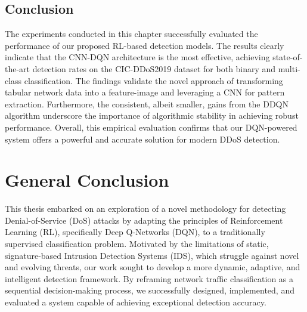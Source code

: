\documentclass[12pt]{report}
\begin{document}
\section{Conclusion}
The experiments conducted in this chapter successfully evaluated the performance of our proposed RL-based detection models. The results clearly indicate that the CNN-DQN architecture is the most effective, achieving state-of-the-art detection rates on the CIC-DDoS2019 dataset for both binary and multi-class classification. The findings validate the novel approach of transforming tabular network data into a feature-image and leveraging a CNN for pattern extraction. Furthermore, the consistent, albeit smaller, gains from the DDQN algorithm underscore the importance of algorithmic stability in achieving robust performance. Overall, this empirical evaluation confirms that our DQN-powered system offers a powerful and accurate solution for modern DDoS detection.

\chapter{General Conclusion}

This thesis embarked on an exploration of a novel methodology for detecting Denial-of-Service (DoS) attacks by adapting the principles of Reinforcement Learning (RL), specifically Deep Q-Networks (DQN), to a traditionally supervised classification problem. Motivated by the limitations of static, signature-based Intrusion Detection Systems (IDS), which struggle against novel and evolving threats, our work sought to develop a more dynamic, adaptive, and intelligent detection framework. By reframing network traffic classification as a sequential decision-making process, we successfully designed, implemented, and evaluated a system capable of achieving exceptional detection accuracy.
\end{document}
